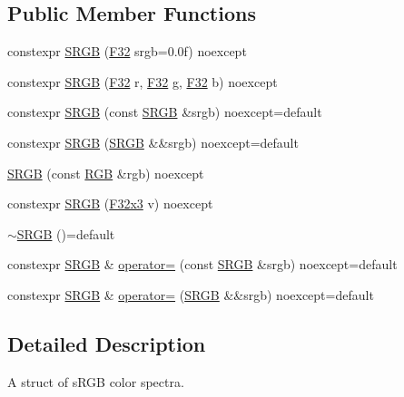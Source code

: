 \subsection*{Public Member Functions}
\begin{DoxyCompactItemize}
\item 
constexpr \hyperlink{structmage_1_1_s_r_g_b_a5f1cc4d90aaa3801f1146eb767d45476}{S\+R\+GB} (\hyperlink{namespacemage_aa97e833b45f06d60a0a9c4fc22ae02c0}{F32} srgb=0.\+0f) noexcept
\item 
constexpr \hyperlink{structmage_1_1_s_r_g_b_acf4eb424d13f8ee60065c3d7e118987b}{S\+R\+GB} (\hyperlink{namespacemage_aa97e833b45f06d60a0a9c4fc22ae02c0}{F32} r, \hyperlink{namespacemage_aa97e833b45f06d60a0a9c4fc22ae02c0}{F32} g, \hyperlink{namespacemage_aa97e833b45f06d60a0a9c4fc22ae02c0}{F32} b) noexcept
\item 
constexpr \hyperlink{structmage_1_1_s_r_g_b_a3b895db44e4e6cc72249fadc093cf084}{S\+R\+GB} (const \hyperlink{structmage_1_1_s_r_g_b}{S\+R\+GB} \&srgb) noexcept=default
\item 
constexpr \hyperlink{structmage_1_1_s_r_g_b_aca835f4281827524ad14345ddb28208a}{S\+R\+GB} (\hyperlink{structmage_1_1_s_r_g_b}{S\+R\+GB} \&\&srgb) noexcept=default
\item 
\hyperlink{structmage_1_1_s_r_g_b_a4b56eeabfaee47d0f0685a061947ce59}{S\+R\+GB} (const \hyperlink{structmage_1_1_r_g_b}{R\+GB} \&rgb) noexcept
\item 
constexpr \hyperlink{structmage_1_1_s_r_g_b_abb02103839b539049a6dd54dd7936b16}{S\+R\+GB} (\hyperlink{namespacemage_a73fbe0da4b8d5bc156bb8453e5b63a17}{F32x3} v) noexcept
\item 
\hyperlink{structmage_1_1_s_r_g_b_aa5bb0738c6026da6c3e4f54869c52cbc}{$\sim$\+S\+R\+GB} ()=default
\item 
constexpr \hyperlink{structmage_1_1_s_r_g_b}{S\+R\+GB} \& \hyperlink{structmage_1_1_s_r_g_b_ab4feb5cd04c21c03d2278468e3241562}{operator=} (const \hyperlink{structmage_1_1_s_r_g_b}{S\+R\+GB} \&srgb) noexcept=default
\item 
constexpr \hyperlink{structmage_1_1_s_r_g_b}{S\+R\+GB} \& \hyperlink{structmage_1_1_s_r_g_b_aef2e40794d1465801e998d64d94f782d}{operator=} (\hyperlink{structmage_1_1_s_r_g_b}{S\+R\+GB} \&\&srgb) noexcept=default
\end{DoxyCompactItemize}


\subsection{Detailed Description}
A struct of s\+R\+GB color spectra. 

